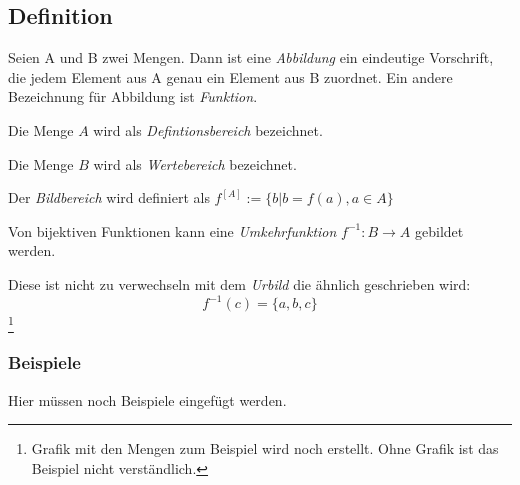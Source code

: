 \subsection{Definition}
Seien A und B zwei Mengen.
Dann ist eine \emph{Abbildung} ein eindeutige Vorschrift, die jedem Element aus A genau ein Element aus B zuordnet.
Ein andere Bezeichnung für Abbildung ist \emph{Funktion}.

Die Menge $A$ wird als \emph{Defintionsbereich} bezeichnet.

Die Menge $B$ wird als \emph{Wertebereich} bezeichnet.

Der \emph{Bildbereich} wird definiert als $ f^{ [A] }:=\{b | b=f(a) , a \in A \}$

Von bijektiven Funktionen kann eine \emph{Umkehrfunktion} $f^{-1} : {B}\rightarrow{A} $ gebildet werden.

Diese ist nicht zu verwechseln mit dem \emph{Urbild} die ähnlich geschrieben wird:
$$ f^{-1}(c) = \{a,b,c\} $$ \footnote{Grafik mit den Mengen zum Beispiel wird noch erstellt. Ohne Grafik ist das Beispiel nicht verständlich.}

\subsubsection*{Beispiele}
Hier müssen noch Beispiele eingefügt werden.